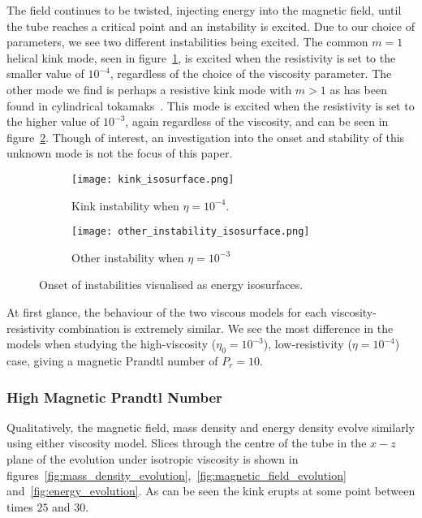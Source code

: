 The field continues to be twisted, injecting energy into the magnetic field, until the tube reaches a critical point and an instability is excited. Due to our choice of parameters, we see two different instabilities being excited. The common $m=1$ helical kink mode, seen in figure~\ref{fig:kink_isosurface}, is excited when the resistivity is set to the smaller value of $10^{-4}$, regardless of the choice of the viscosity parameter. The other mode we find is perhaps a resistive kink mode with $m>1$ as has been found in cylindrical tokamaks~\cite{furthTearingModeCylindrical1973a}. This mode is excited when the resistivity is set to the higher value of $10^{-3}$, again regardless of the viscosity, and can be seen in figure~\ref{fig:other_instability_isosurface}. Though of interest, an investigation into the onset and stability of this unknown mode is not the focus of this paper.

\begin{figure}[t]
  \centering
  \begin{subfigure}{.45\textwidth}
  \centering
  \texttt{[image: kink\_isosurface.png]}
  \caption{Kink instability when $\eta=10^{-4}$.}
  \label{fig:kink_isosurface}
  \end{subfigure}
  \begin{subfigure}{.45\textwidth}
  \centering
  \texttt{[image: other\_instability\_isosurface.png]}
  \caption{Other instability when $\eta=10^{-3}$}
  \label{fig:other_instability_isosurface}
  \end{subfigure}
  
  \caption{Onset of instabilities visualised as energy isosurfaces.}
  \label{fig:instability_isosurfaces}
\end{figure}

At first glance, the behaviour of the two viscous models for each viscosity-resistivity combination is extremely similar. We see the most difference in the models when studying the high-viscosity ($\eta_0 = 10^{-3}$), low-resistivity ($\eta = 10^{-4}$) case, giving a magnetic Prandtl number of $P_r = 10$. 

\subsubsection{High Magnetic Prandtl Number}

Qualitatively, the magnetic field, mass density and energy density evolve similarly using either viscosity model. Slices through the centre of the tube in the $x - z$ plane of the evolution under isotropic viscosity is shown in figures~\ref{fig:mass_density_evolution},~\ref{fig:magnetic_field_evolution} and~\ref{fig:energy_evolution}. As can be seen the kink erupts at some point between times $25$ and $30$.


